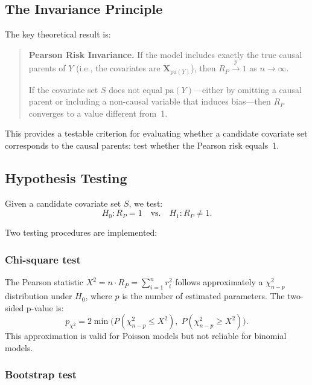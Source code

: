 \documentclass[11pt,a4paper]{article}
\newcommand{\pa}{\mathrm{pa}}
\begin{document}
\subsection{The Invariance Principle}

The key theoretical result is:

\begin{quote}
\textbf{Pearson Risk Invariance.} If the model includes exactly the true causal parents of $Y$ (i.e., the covariates are $\mathbf{X}_{\pa(Y)}$), then $R_P \xrightarrow{p} 1$ as $n \to \infty$.

If the covariate set $S$ does not equal $\pa(Y)$---either by omitting a causal parent or including a non-causal variable that induces bias---then $R_P$ converges to a value different from~1.
\end{quote}

This provides a testable criterion for evaluating whether a candidate covariate set corresponds to the causal parents: test whether the Pearson risk equals~1.

\subsection{Hypothesis Testing}
\label{sec:testing}

Given a candidate covariate set $S$, we test:
\begin{equation}
H_0: R_P = 1 \quad \text{vs.} \quad H_1: R_P \neq 1.
\end{equation}

Two testing procedures are implemented:

\subsubsection{Chi-square test}

The Pearson statistic $X^2 = n \cdot R_P = \sum_{i=1}^n r_i^2$ follows approximately a $\chi^2_{n-p}$ distribution under $H_0$, where $p$ is the number of estimated parameters. The two-sided p-value is:
\begin{equation}
p_{\chi^2} = 2 \min\!\big(P(\chi^2_{n-p} \leq X^2),\; P(\chi^2_{n-p} \geq X^2)\big).
\end{equation}
This approximation is valid for Poisson models but not reliable for binomial models.

\subsubsection{Bootstrap test}
\end{document}
